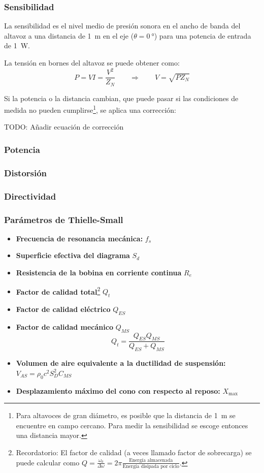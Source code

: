 \documentclass[12pt, a4paper]{article}
\begin{document}
\subsubsection{Sensibilidad}

La sensibilidad es el nivel medio de presión sonora en el ancho de banda del altavoz a una distancia de \qty{1}{\meter} en el eje ($\theta = \qty{0}{\degree}$) para una potencia de entrada de \qty{1}{\watt}.

La tensión en bornes del altavoz se puede obtener como:
\[ P = V  I = \frac{V^2}{Z_N} \qquad \Longrightarrow \qquad V = \sqrt{P   Z_N} \]

Si la potencia o la distancia cambian, que puede pasar si las condiciones de medida no pueden cumplirse\footnote{Para altavoces de gran diámetro, es posible que la distancia de \qty{1}{\meter} se encuentre en campo cercano. Para medir la sensibilidad se escoge entonces una distancia mayor.}, se aplica una corrección:

TODO: Añadir ecuación de corrección

\subsubsection{Potencia}
\subsubsection{Distorsión}
\subsubsection{Directividad}
\subsubsection{Parámetros de Thielle-Small}

\begin{itemize}
     \item \textbf{Frecuencia de resonancia mecánica:} $f_s$
     \item \textbf{Superficie efectiva del diagrama} $S_d$
     \item \textbf{Resistencia de la bobina en corriente continua} $R_e$
     \item \textbf{Factor de calidad total}\footnote{Recordatorio: El factor de calidad (a veces llamado factor de sobrecarga) se puede calcular como $Q= \frac{\omega_0}{\Delta \omega} = 2\pi \frac{\text{Energía almacenada}}{\text{Energía disipada por ciclo}}$.} $Q_t$
     \item \textbf{Factor de calidad eléctrico} $Q_{ES}$
     \item \textbf{Factor de calidad mecánico} $Q_{MS}$
     \[ Q_t = \frac{Q_{ES}Q_{MS}}{Q_{ES} + Q_{MS}} \]
     \item \textbf{Volumen de aire equivalente a la ductilidad de suspensión:} $V_{AS} = \rho_0c^2S_D^2C_{MS}$
     \item \textbf{Desplazamiento máximo del cono con respecto al reposo:} $X_{\text{max}}$
\end{itemize}
\end{document}
